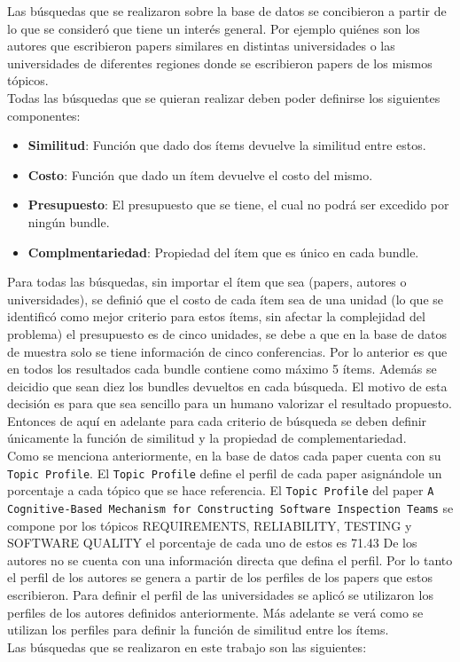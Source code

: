 Las búsquedas que se realizaron sobre la base de datos se concibieron a partir de lo que se consideró que tiene un interés general. Por ejemplo quiénes son los autores que escribieron papers similares en distintas universidades o las universidades de diferentes regiones donde se escribieron papers de los mismos tópicos.\\
Todas las búsquedas que se quieran realizar deben poder definirse los siguientes componentes:
\begin{itemize}
  \item \textbf{Similitud}: Función que dado dos ítems devuelve la similitud entre estos.
  \item \textbf{Costo}: Función que dado un ítem devuelve el costo del mismo.
  \item \textbf{Presupuesto}: El presupuesto que se tiene, el cual no podrá ser excedido por ningún bundle.
  \item \textbf{Complmentariedad}: Propiedad del ítem que es único en cada bundle.
\end{itemize}
Para todas las búsquedas, sin importar el ítem que sea (papers, autores o universidades),  se definió que el costo de cada ítem sea de una unidad (lo que se identificó como mejor criterio para estos ítems, sin afectar la complejidad del problema) el presupuesto es de cinco unidades, se debe a que en la base de datos de muestra solo se tiene información de cinco conferencias. Por lo anterior es que en todos los resultados cada bundle contiene como máximo 5 ítems. Además se deicidio que sean diez los bundles devueltos en cada búsqueda. El motivo de esta decisión es para que sea sencillo para un humano valorizar el resultado propuesto. Entonces de aquí en adelante para cada criterio de búsqueda se deben definir únicamente la función de similitud y la propiedad de complementariedad.\\
Como se menciona anteriormente, en la base de datos cada paper cuenta con su \texttt{Topic Profile}. El \texttt{Topic Profile} define el perfil de cada paper asignándole un porcentaje a cada tópico que se hace referencia. El \texttt{Topic Profile} del paper \texttt{A Cognitive-Based Mechanism for Constructing Software Inspection Teams}  se compone por los tópicos  REQUIREMENTS, RELIABILITY, TESTING y SOFTWARE QUALITY el porcentaje de cada uno de estos es 71.43 %
De los autores no se cuenta con una información directa que defina el perfil. Por lo tanto el perfil de los autores  se genera a partir de los perfiles de los papers que estos escribieron. Para definir el perfil de las universidades se aplicó  se utilizaron los perfiles de los autores definidos anteriormente. Más adelante se verá como se utilizan los perfiles para definir la función de similitud entre los ítems.\\
Las búsquedas que se realizaron en este trabajo son las siguientes:
